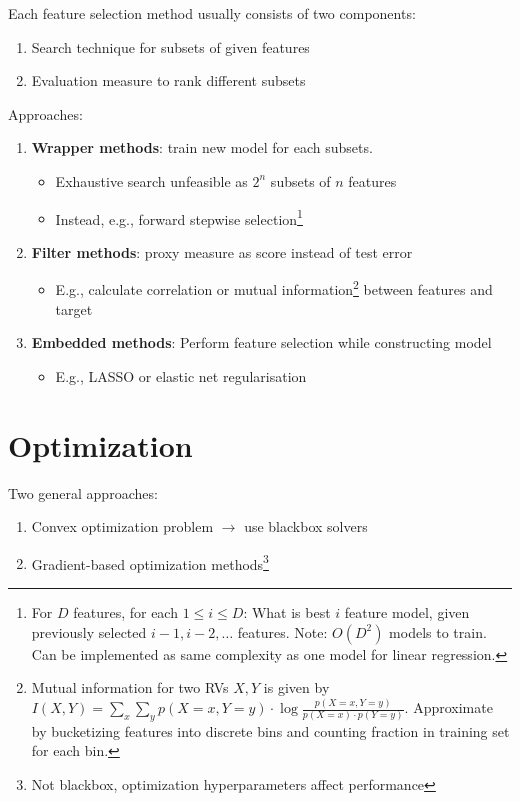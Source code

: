 \documentclass[11pt, %
	oneside, %
	english, %
	onehalfspacing, %
	parskip, %
	]{article} %
\theoremstyle{definition}
\begin{document}
Each feature selection method usually consists of two components:
\begin{enumerate}
	\item Search technique for subsets of given features
	\item Evaluation measure to rank different subsets
\end{enumerate}
Approaches:
\begin{enumerate}

	\item \textbf{Wrapper methods}: train new model for each subsets.
	\begin{itemize}
		\item Exhaustive search unfeasible as $2^n$ subsets of $n$ features
		\item Instead, e.g., forward stepwise selection\footnote{For $D$ features, for each $1 \leq i \leq D$: What is best $i$ feature model, given previously selected $i-1, i-2, \dots$ features. Note: $O(D^2)$ models to train. Can be implemented as same complexity as one model for linear regression.}
	\end{itemize}
	\item \textbf{Filter methods}: proxy measure as score instead of test error
	\begin{itemize}
		\item E.g., calculate correlation or mutual information\footnote{
			Mutual information for two RVs $X,Y$ is given by $I(X, Y)=\sum_x \sum_y p(X=x, Y=y) \cdot \log \frac{p(X=x, Y=y)}{p(X=x) \cdot p(Y=y)}$. Approximate by bucketizing features into discrete bins and counting fraction in training set for each bin.
		} between features and target
	\end{itemize}
	\item \textbf{Embedded methods}: Perform feature selection while constructing model
	\begin{itemize}
		\item E.g., LASSO or elastic net regularisation
	\end{itemize}
\end{enumerate}


\section{Optimization}

Two general approaches:
\begin{enumerate}
	\item Convex optimization problem $\to$ use blackbox solvers
	\item Gradient-based optimization methods\footnote{Not blackbox, optimization hyperparameters affect performance}
\end{enumerate}
\end{document}
